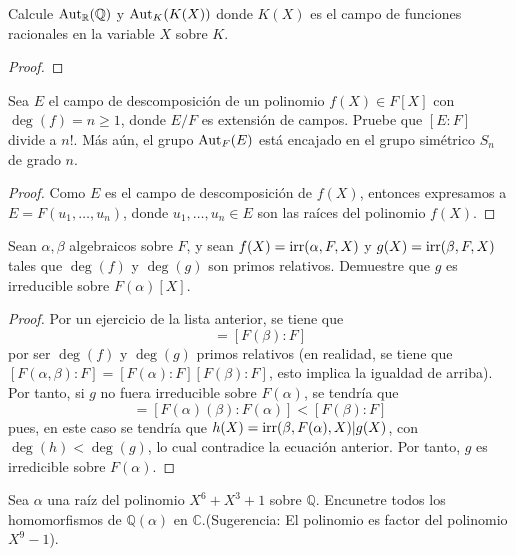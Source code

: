 \documentclass[12pt]{report}
\theoremstyle{largebreak}
\newcommand\aut{\textup{Aut}}
\newcommand\irr{\textup{irr}}
\begin{document}
\begin{excer}
    Calcule $\aut_{\mathbb{R}}(\mathbb{Q})$ y $\aut_{K}(K(X))$ donde $K(X)$ es el campo de funciones racionales en la variable $X$ sobre $K$.
\end{excer}

\begin{proof}
    
\end{proof}

\begin{excer}
    Sea $E$ el campo de descomposición de un polinomio $f(X)\in F[X]$ con $\deg(f)=n\geq1$, donde $E/F$ es extensión de campos. Pruebe que $[E:F]$ divide a $n!$. Más aún, el grupo $\textup{Aut}_F(E)$ está encajado en el grupo simétrico $S_n$ de grado $n$.
\end{excer}

\begin{proof}
    Como $E$ es el campo de descomposición de $f(X)$, entonces expresamos a $E=F\left(u_1,\dots,u_n\right)$, donde $u_1,\dots,u_n\in E$ son las raíces del polinomio $f(X)$.
\end{proof}

\begin{excer}
    Sean $\alpha, \beta$ algebraicos sobre $F$, y sean $f(X)=\irr(\alpha, F, X)$ y $g(X)=\irr(\beta, F, X)$ tales que $\deg(f)$ y $\deg(g)$ son primos relativos. Demuestre que $g$ es irreducible sobre $F(\alpha)[X]$.
\end{excer}

\begin{proof}
    Por un ejercicio de la lista anterior, se tiene que
    \begin{equation*}
        [F(\alpha,\beta):F(\alpha)]=[F(\beta):F]
    \end{equation*}
    por ser $\deg(f)$ y $\deg(g)$ primos relativos (en realidad, se tiene que $[F(\alpha,\beta):F]=[F(\alpha):F][F(\beta):F]$, esto implica la igualdad de arriba). Por tanto, si $g$ no fuera irreducible sobre $F(\alpha)$, se tendría que
    \begin{equation*}
        [F(\alpha,\beta):F(\alpha)]=[F(\alpha)(\beta):F(\alpha)]<[F(\beta):F]
    \end{equation*}
    pues, en este caso se tendría que $h(X)=\irr(\beta,F(\alpha),X)|g(X)$, con $\deg(h)<\deg(g)$, lo cual contradice la ecuación anterior. Por tanto, $g$ es irredicible sobre $F(\alpha)$.
\end{proof}

\begin{excer}
    Sea $\alpha$ una raíz del polinomio $X^6+X^3+1$ sobre $\mathbb{Q}$. Encunetre todos los homomorfismos de $\mathbb{Q}(\alpha)$ en $\mathbb{C}$.(Sugerencia: El polinomio es factor del polinomio $X^9-1$).
\end{excer}
\end{document}
